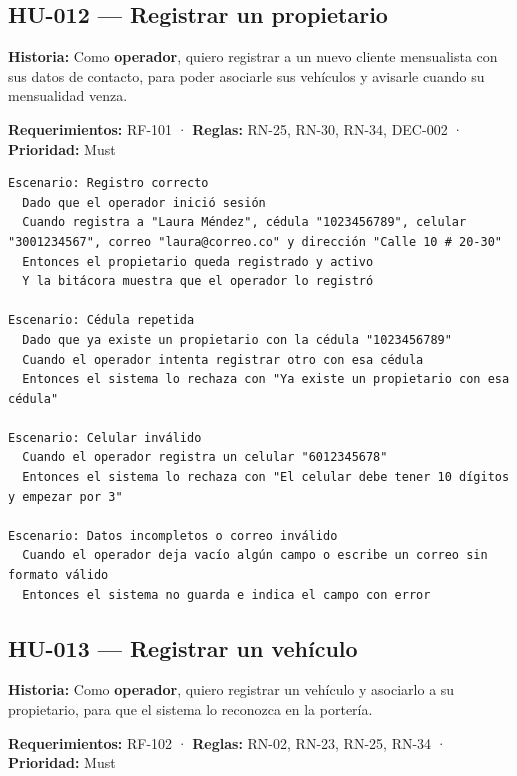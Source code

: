 \subsection{HU-012 — Registrar un propietario}

\textbf{Historia:} Como \textbf{operador}, quiero registrar a un nuevo cliente mensualista con sus datos de contacto, para poder asociarle sus vehículos y avisarle cuando su mensualidad venza.


\textbf{Requerimientos:} RF-101 · \textbf{Reglas:} RN-25, RN-30, RN-34, DEC-002 · \textbf{Prioridad:} Must


\begin{lstlisting}[style=gherkin]
Escenario: Registro correcto
  Dado que el operador inició sesión
  Cuando registra a "Laura Méndez", cédula "1023456789", celular "3001234567", correo "laura@correo.co" y dirección "Calle 10 # 20-30"
  Entonces el propietario queda registrado y activo
  Y la bitácora muestra que el operador lo registró

Escenario: Cédula repetida
  Dado que ya existe un propietario con la cédula "1023456789"
  Cuando el operador intenta registrar otro con esa cédula
  Entonces el sistema lo rechaza con "Ya existe un propietario con esa cédula"

Escenario: Celular inválido
  Cuando el operador registra un celular "6012345678"
  Entonces el sistema lo rechaza con "El celular debe tener 10 dígitos y empezar por 3"

Escenario: Datos incompletos o correo inválido
  Cuando el operador deja vacío algún campo o escribe un correo sin formato válido
  Entonces el sistema no guarda e indica el campo con error
\end{lstlisting}

\subsection{HU-013 — Registrar un vehículo}

\textbf{Historia:} Como \textbf{operador}, quiero registrar un vehículo y asociarlo a su propietario, para que el sistema lo reconozca en la portería.


\textbf{Requerimientos:} RF-102 · \textbf{Reglas:} RN-02, RN-23, RN-25, RN-34 · \textbf{Prioridad:} Must


